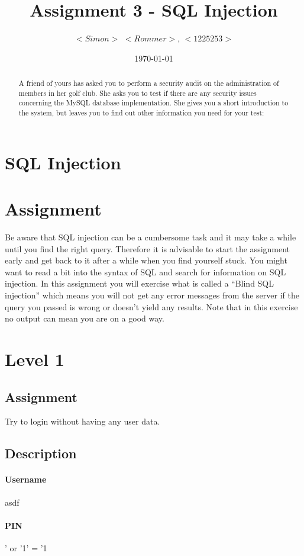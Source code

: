 \documentclass{scrartcl}
\title{Assignment 3 - SQL Injection}
\author{$<Simon>$ $<Rommer>$, $<1225253>$}
\date\today{}
\newcommand\solution[2]{{\paragraph{#1}#2}}
\begin{document}
\maketitle

\begin{abstract}
	
A friend of yours has asked you to perform a security audit on the administration of members in her golf club. She asks you to test if there are any security issues concerning the MySQL database implementation. She gives you a short introduction to the system, but leaves you to find out other information you need for your test:

\end{abstract}



\section{SQL Injection}

\section*{Assignment}
Be aware that SQL injection can be a cumbersome task and it may take a while
until you find the right query. Therefore it is advisable to start the
assignment early and get back to it after a while when you find yourself stuck.
You might want to read a bit into the syntax of SQL and search for information
on SQL injection. In this assignment you will exercise what is called a ``Blind
SQL injection'' which means you will not get any error messages from the server
if the query you passed is wrong or doesn't yield any results. Note that in
this exercise no output can mean you are on a good way. 



\section*{Level 1}
\subsection*{Assignment}
Try to login without having any user data.

\subsection*{Description}
\solution{Username}{asdf}
\solution{PIN}{' or '1' = '1} 
\end{document}
